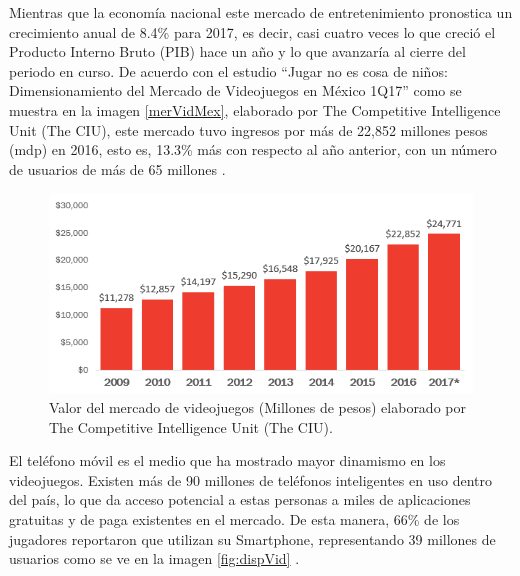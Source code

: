 Mientras que la economía nacional este mercado de entretenimiento pronostica un crecimiento anual de 8.4\% para 2017, es decir, casi cuatro veces lo que creció el Producto Interno Bruto (PIB) hace un año y lo que avanzaría al cierre del periodo en curso. De acuerdo con el estudio “Jugar no es cosa de niños: Dimensionamiento del Mercado de Videojuegos en México 1Q17” como se muestra en la imagen \ref{merVidMex}, elaborado por The Competitive Intelligence Unit (The CIU), este mercado tuvo ingresos por más de 22,852 millones pesos (mdp) en 2016, esto es, 13.3\% más con respecto al año anterior, con un número de usuarios de más de 65 millones \cite{vid03}. 
\\[1pt] 
\begin{figure}
	\centering
	\includegraphics[width=\textwidth]{03MarcoTeorico/imageR/merVidMex.png}
	\caption{Valor del mercado de videojuegos (Millones de pesos) elaborado por The Competitive Intelligence Unit (The CIU).}
	\label{fig:merVidMex}
\end{figure}

El teléfono móvil es el medio que ha mostrado mayor dinamismo en los videojuegos. Existen más de 90 millones de teléfonos inteligentes en uso dentro del país, lo que da acceso potencial a estas personas a miles de aplicaciones gratuitas y de paga existentes en el mercado. De esta manera, 66\% de los jugadores reportaron que utilizan su Smartphone, representando 39 millones de usuarios como se ve en la imagen \ref{fig:dispVid} .
\\[1pt] 	

